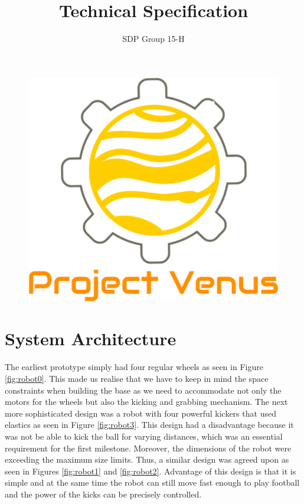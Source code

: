 \documentclass[12pt]{article}
\title{Technical Specification}
\author{SDP Group 15-H}
\begin{document}
\begin{figure}
    \vspace*{-3em}
    \centering
    \includegraphics[scale=.18]{logo.png}
\end{figure}

\setlength{\droptitle}{-4em}
\maketitle

\section{System Architecture}

The earliest prototype simply had four regular wheels as seen in Figure
\ref{fig:robot0}. This made us realise that we have to keep in mind the space
constraints when building the base as we need to accommodate not only the motors
for the wheels but also the kicking and grabbing mechanism.
The next more sophisticated design was a robot with four powerful kickers
that used elastics as seen in Figure \ref{fig:robot3}. This design had a
disadvantage because it was not be able to kick the ball for varying distances,
which was an essential requirement for the first milestone. Moreover, the
dimensions of the robot were exceeding the maximum size limits. Thus, a similar
design was agreed upon as seen in Figures \ref{fig:robot1} and \ref{fig:robot2}.
Advantage of this design is that it is simple and at the same time the robot can
still move fast enough to play football and the power of the kicks can be
precisely controlled.
\end{document}
